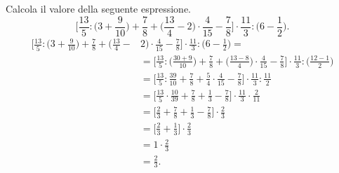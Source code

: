 \begin{esempio}
  Calcola il valore della seguente espressione.
\[\bigg[\frac{13}{5}:\bigg(3+\frac{9}{10}\bigg)+\frac{7}{8}+\bigg(\frac{13}{4}-2\bigg)\cdot\frac{4}{15}-\frac{7}{8}%
\bigg]\cdot\frac{11}{3}:\bigg(6-\frac{1}{2}\bigg).\]
  \begin{align*}
\bigg[\frac{13}{5}:\bigg(3+\frac{9}{10}\bigg)+\frac{7}{8}+\bigg(\frac{13}{4}-&2\bigg)\cdot\frac{4}{15}-\frac{7}{8}%
\bigg]\cdot\frac{11}{3}:\bigg(6-\frac{1}{2}\bigg)=\\
&=
\bigg[\frac{13}{5}:\bigg(\frac{30+9}{10}\bigg)+\frac{7}{8}+\bigg(\frac{13-8}{4}\bigg)\cdot\frac{4}{15}-\frac{7}{8}%
\bigg]\cdot\frac{11}{3}:\bigg(\frac{12-1}{2}\bigg)\\
 &=
\bigg[\frac{13}{5}:\frac{39}{10}+\frac{7}{8}+\frac{5}{4}\cdot\frac{4}{15}-\frac{7}{8}%
\bigg]\cdot\frac{11}{3}:\frac{11}{2}\\
 &=
\bigg[\frac{13}{5}\cdot\frac{10}{39}+\frac{7}{8}+\frac{1}{3}-\frac{7}{8}%
\bigg]\cdot\frac{11}{3}\cdot\frac{2}{11}\\
 &=
\bigg[\frac{2}{3}+\frac{7}{8}+\frac{1}{3}-\frac{7}{8}%
\bigg]\cdot\frac{2}{3}\\
 &=
\bigg[\frac{2}{3}+\frac{1}{3}\bigg]\cdot\frac{2}{3}\\
&=1\cdot\frac{2}{3}\\
&=\frac{2}{3}.
  \end{align*}
\end{esempio}
\clearpage
